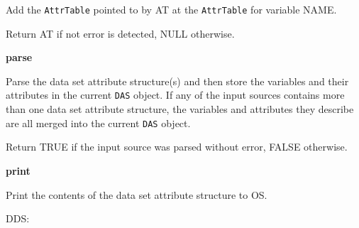 \begin{description}
Add the {\tt AttrTable} pointed to by AT at the {\tt AttrTable} for variable
NAME.

Return AT if not error is detected, NULL otherwise.

\item {\bf parse}


Parse the data set attribute structure(s) and then store the variables and
their attributes in the current {\tt DAS} object.  If any of the input
sources contains more than one data set attribute structure, the variables
and attributes they describe are all merged into the current {\tt DAS}
object.

Return TRUE if the input source was parsed without error, FALSE otherwise.

\item {\bf print}


Print the contents of the data set attribute structure to OS. 

\end{description}

DDS:

